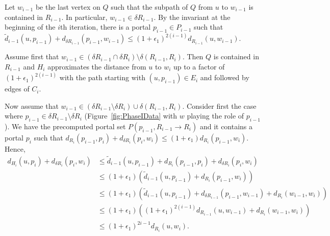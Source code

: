 \documentclass[11pt]{article}
\begin{document}
Let $w_{i-1}$ be the last vertex on $Q$ such that the subpath of $Q$ from $u$ to $w_{i-1}$ is contained in $R_{i-1}$. In particular, $w_{i-1}\in\delta R_{i-1}$. By the invariant at the beginning of the $i$th iteration, there is a portal $p_{i-1}\in P_{i-1}$ such that $\tilde{d}_{i-1}(u,p_{i-1}) + d_{\delta R_{i-1}}(p_{i-1},w_{i-1}) \leq (1+\epsilon_1)^{2(i-1)}d_{R_{i-1}}(u,w_{i-1})$.

Assume first that $w_{i-1}\in (\delta R_{i-1}\cap\delta R_i)\setminus\delta(R_{i-1},R_i)$. Then $Q$ is contained in $R_{i-1}$ and $H_i$ approximates the distance from $u$ to $w_i$ up to a factor of $(1+\epsilon_1)^{2(i-1)}$ with the path starting with $(u,p_{i-1})\in E_i$ and followed by edges of $C_i$.

Now assume that $w_{i-1}\in (\delta R_{i-1}\setminus\delta R_i)\cup\delta(R_{i-1},R_i)$. Consider first the case where
$p_{i-1}\in\delta R_{i-1}\setminus\delta R_i$ (Figure~\ref{fig:PhaseIData} with $w$ playing the role of $p_{i-1}$). We have the precomputed portal set $P(p_{i-1},R_{i-1}\rightarrow R_i)$ and it contains a portal $p_i$ such that $d_{R_i}(p_{i-1},p_i) + d_{\delta R_i}(p_i,w_i) \leq (1+\epsilon_1)d_{R_i}(p_{i-1},w_i)$. Hence,
\begin{align*}
  d_{H_i}(u,p_i) + d_{\delta R_i}(p_i,w_i) & \leq \tilde{d}_{i-1}(u,p_{i-1}) + d_{R_i}(p_{i-1},p_i) + d_{\delta R_i}(p_i,w_i)\\
  & \leq (1+\epsilon_1)(\tilde{d}_{i-1}(u,p_{i-1}) + d_{R_i}(p_{i-1},w_i))\\
  & \leq (1+\epsilon_1)(\tilde{d}_{i-1}(u,p_{i-1}) + d_{\delta R_{i-1}}(p_{i-1},w_{i-1}) + d_{R_i}(w_{i-1},w_i))\\
  & \leq (1+\epsilon_1)((1+\epsilon_1)^{2(i-1)}d_{R_{i-1}}(u,w_{i-1}) + d_{R_i}(w_{i-1},w_i))\\
  & \leq (1+\epsilon_1)^{2i-1}d_{R_i}(u,w_i).
\end{align*}
\end{document}
